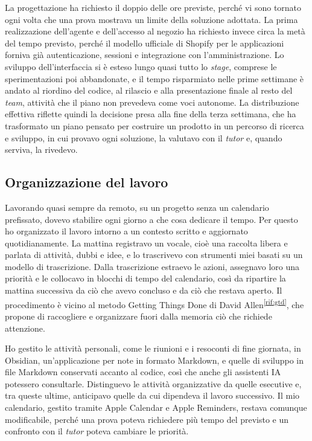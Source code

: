 La progettazione ha richiesto il doppio delle ore previste, perché vi sono tornato ogni volta che
una prova mostrava un limite della soluzione adottata. La prima realizzazione dell’agente e
dell’accesso al negozio ha richiesto invece circa la metà del tempo previsto, perché il modello
ufficiale di Shopify per le applicazioni forniva già autenticazione, sessioni e integrazione con
l’amministrazione. Lo sviluppo dell’interfaccia si è esteso lungo quasi tutto lo \emph{stage},
comprese le sperimentazioni poi abbandonate, e il tempo risparmiato nelle prime settimane è andato
al riordino del codice, al rilascio e alla presentazione finale al resto del \emph{team}, attività
che il piano non prevedeva come voci autonome. La distribuzione effettiva riflette quindi la
decisione presa alla fine della terza settimana, che ha trasformato un piano pensato per costruire
un prodotto in un percorso di ricerca e sviluppo, in cui provavo ogni soluzione, la valutavo con
il \emph{tutor} e, quando serviva, la rivedevo.

\subsection{Organizzazione del lavoro}
\label{sec:organizzazione-lavoro}

Lavorando quasi sempre da remoto, su un progetto senza un calendario prefissato, dovevo stabilire
ogni giorno a che cosa dedicare il tempo. Per questo ho organizzato il lavoro intorno a un contesto
scritto e aggiornato quotidianamente. La mattina registravo un  vocale, cioè una raccolta libera e parlata di attività, dubbi e idee, e lo trascrivevo con
strumenti miei basati su un modello di trascrizione. Dalla trascrizione estraevo le azioni,
assegnavo loro una priorità e le collocavo in blocchi di tempo del calendario, così da ripartire la
mattina successiva da ciò che avevo concluso e da ciò che restava aperto. Il procedimento è vicino
al metodo Getting Things Done di David Allen\textsuperscript{\ref{rif:gtd}}, che propone di
raccogliere e organizzare fuori dalla memoria ciò che richiede attenzione.

Ho gestito le attività personali, come le riunioni e i resoconti di fine giornata, in Obsidian,
un’applicazione per note in formato Markdown, e quelle di sviluppo in file Markdown conservati
accanto al codice, così che anche gli assistenti IA potessero consultarle. Distinguevo le attività
organizzative da quelle esecutive e, tra queste ultime, anticipavo quelle da cui dipendeva il
lavoro successivo. Il mio calendario, gestito tramite Apple Calendar e Apple Reminders, restava
comunque modificabile, perché una prova poteva richiedere più tempo del previsto e un confronto
con il \emph{tutor} poteva cambiare le priorità.


